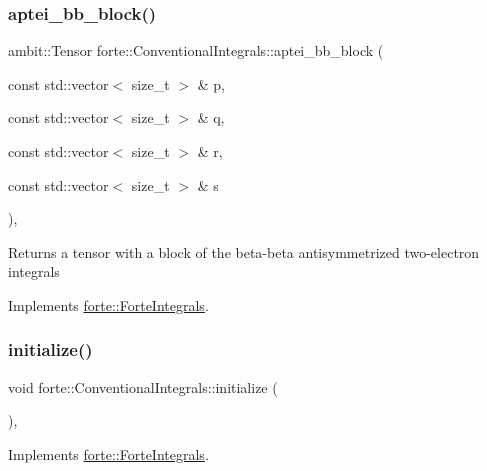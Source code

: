 \subsubsection{\texorpdfstring{aptei\+\_\+bb\+\_\+block()}{aptei\_bb\_block()}}
{\footnotesize\ttfamily ambit\+::\+Tensor forte\+::\+Conventional\+Integrals\+::aptei\+\_\+bb\+\_\+block (\begin{DoxyParamCaption}\item[{const std\+::vector$<$ size\+\_\+t $>$ \&}]{p,  }\item[{const std\+::vector$<$ size\+\_\+t $>$ \&}]{q,  }\item[{const std\+::vector$<$ size\+\_\+t $>$ \&}]{r,  }\item[{const std\+::vector$<$ size\+\_\+t $>$ \&}]{s }\end{DoxyParamCaption})\hspace{0.3cm}{\ttfamily [override]}, {\ttfamily [virtual]}}

\begin{DoxyReturn}{Returns}
a tensor with a block of the beta-\/beta antisymmetrized two-\/electron integrals 
\end{DoxyReturn}


Implements \mbox{\hyperlink{classforte_1_1_forte_integrals_ae2799dc7cbfd456603a2b841b26582ab}{forte\+::\+Forte\+Integrals}}.

\mbox{\label{classforte_1_1_conventional_integrals_a9d9d6528eb1241a9e03fcf82e4a88dbe}} 
\subsubsection{\texorpdfstring{initialize()}{initialize()}}
{\footnotesize\ttfamily void forte\+::\+Conventional\+Integrals\+::initialize (\begin{DoxyParamCaption}{ }\end{DoxyParamCaption})\hspace{0.3cm}{\ttfamily [override]}, {\ttfamily [virtual]}}



Implements \mbox{\hyperlink{classforte_1_1_forte_integrals_a7862835fa0f5f9abe13dfcd6730fa4be}{forte\+::\+Forte\+Integrals}}.

\mbox{\label{classforte_1_1_conventional_integrals_aef0130cb53212f32652a56e83e204519}} 
